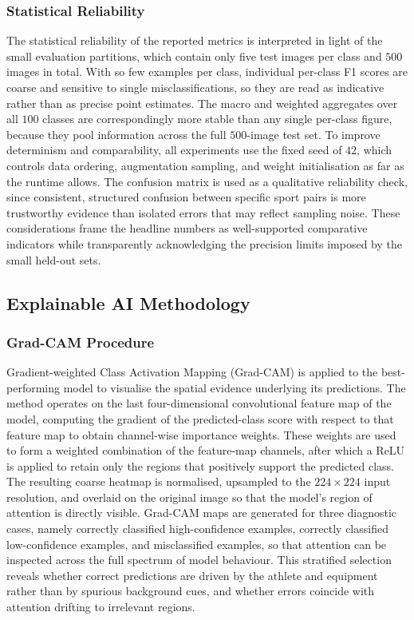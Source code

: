 \subsubsection{Statistical Reliability}
\label{subsubsec:method-reliability}

The statistical reliability of the reported metrics is interpreted in light of the small evaluation partitions, which contain only five test images per class and $500$ images in total.
With so few examples per class, individual per-class F1 scores are coarse and sensitive to single misclassifications, so they are read as indicative rather than as precise point estimates.
The macro and weighted aggregates over all $100$ classes are correspondingly more stable than any single per-class figure, because they pool information across the full $500$-image test set.
To improve determinism and comparability, all experiments use the fixed seed of $42$, which controls data ordering, augmentation sampling, and weight initialisation as far as the runtime allows.
The confusion matrix is used as a qualitative reliability check, since consistent, structured confusion between specific sport pairs is more trustworthy evidence than isolated errors that may reflect sampling noise.
These considerations frame the headline numbers as well-supported comparative indicators while transparently acknowledging the precision limits imposed by the small held-out sets.

\subsection{Explainable AI Methodology}
\label{subsec:method-xai}

\subsubsection{Grad-CAM Procedure}
\label{subsubsec:method-gradcam}

Gradient-weighted Class Activation Mapping (Grad-CAM) \citep{selvaraju2017gradcam} is applied to the best-performing model to visualise the spatial evidence underlying its predictions.
The method operates on the last four-dimensional convolutional feature map of the model, computing the gradient of the predicted-class score with respect to that feature map to obtain channel-wise importance weights.
These weights are used to form a weighted combination of the feature-map channels, after which a ReLU is applied to retain only the regions that positively support the predicted class.
The resulting coarse heatmap is normalised, upsampled to the $224\times224$ input resolution, and overlaid on the original image so that the model's region of attention is directly visible.
Grad-CAM maps are generated for three diagnostic cases, namely correctly classified high-confidence examples, correctly classified low-confidence examples, and misclassified examples, so that attention can be inspected across the full spectrum of model behaviour.
This stratified selection reveals whether correct predictions are driven by the athlete and equipment rather than by spurious background cues, and whether errors coincide with attention drifting to irrelevant regions.

